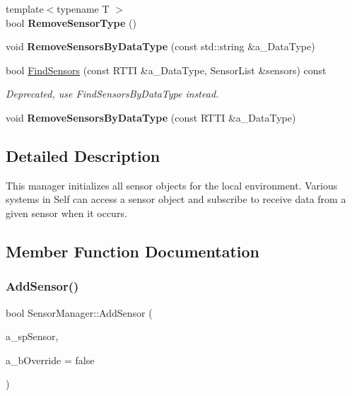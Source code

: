 \begin{DoxyCompactItemize}
{\footnotesize template$<$typename T $>$ }\\bool {\bfseries Remove\+Sensor\+Type} ()
\item 
\mbox{\label{class_sensor_manager_adeab0a24c5a396227d87ee34f45c5fb6}} 
void {\bfseries Remove\+Sensors\+By\+Data\+Type} (const std\+::string \&a\+\_\+\+Data\+Type)
\item 
\mbox{\label{class_sensor_manager_a9cfd39d423b9d214994e4c8776950849}} 
bool \hyperlink{class_sensor_manager_a9cfd39d423b9d214994e4c8776950849}{Find\+Sensors} (const R\+T\+TI \&a\+\_\+\+Data\+Type, Sensor\+List \&sensors) const
\begin{DoxyCompactList}\small\item\em Deprecated, use Find\+Sensors\+By\+Data\+Type instead. \end{DoxyCompactList}\item 
\mbox{\label{class_sensor_manager_a4bbc99c3107af4cd3c84d87d288710d9}} 
void {\bfseries Remove\+Sensors\+By\+Data\+Type} (const R\+T\+TI \&a\+\_\+\+Data\+Type)
\end{DoxyCompactItemize}


\subsection{Detailed Description}
This manager initializes all sensor objects for the local environment. Various systems in Self can access a sensor object and subscribe to receive data from a given sensor when it occurs. 

\subsection{Member Function Documentation}
\mbox{\label{class_sensor_manager_a68d55cf9952fd77c7977bb5563bf11fe}} 
\subsubsection{\texorpdfstring{Add\+Sensor()}{AddSensor()}}
{\footnotesize\ttfamily bool Sensor\+Manager\+::\+Add\+Sensor (\begin{DoxyParamCaption}\item[{const \hyperlink{class_sensor_manager_a5cd8f6f5dfe0ccc8875ed536ae5df51e}{I\+Sensor\+SP} \&}]{a\+\_\+sp\+Sensor,  }\item[{bool}]{a\+\_\+b\+Override = {\ttfamily false} }\end{DoxyParamCaption})}

